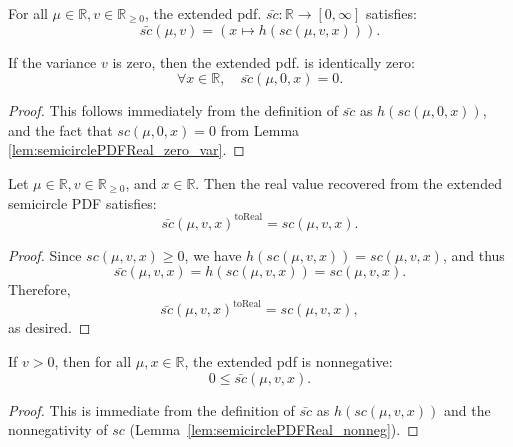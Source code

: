 \begin{lemma}
  \leanok
  \label{lem:semicirclePDF_def}
  For all $\mu \in \mathbb{R} , v \in \mathbb{R}_{\geq 0}$, the extended pdf. $ \bar{sc} : \mathbb{R} \to [0,\infty]$  satisfies:
  $$
    \bar{sc}(\mu,v) = \left( x \mapsto h(sc(\mu,v,x)) \right).
  $$
\end{lemma}

\begin{lemma}
  \leanok
  \label{lem:semicirclePDF_zero_var}
  If the variance $v$ is zero, then the extended pdf. is identically zero:
 $$ 
    \forall x \in \mathbb{R}, \quad \bar{sc}(\mu,0,x) = 0.
 $$ 
\end{lemma}
\begin{proof}
    This follows immediately from the definition of $\bar{sc}$ as $h(sc(\mu,0,x))$, and the fact that $sc(\mu,0,x) = 0$ from Lemma \ref{lem:semicirclePDFReal_zero_var}.
\end{proof}

\begin{lemma}
    \leanok
    \label{lem:toReal_semicirclePDF}
    Let $ \mu \in \mathbb{R} ,  v \in \mathbb{R}_{\ge 0}$, and $x \in \mathbb{R} $.
Then the real value recovered from the extended semicircle PDF satisfies:
\[
    \bar{sc}(\mu, v, x)^{\operatorname{toReal}} = sc(\mu, v, x).
\]
\end{lemma}
\begin{proof}
Since $sc(\mu, v, x) \ge 0$, we have $h(sc(\mu, v, x)) = sc(\mu, v, x)$, and thus
\[
    \bar{sc}(\mu, v, x) = h(sc(\mu, v, x)) = sc(\mu, v, x).
\]
Therefore,
\[
    \bar{sc}(\mu, v, x)^{\operatorname{toReal}} = sc(\mu, v, x),
\]
as desired.
\end{proof}

\begin{lemma}
  \leanok
  \label{lem:semicirclePDF_nonneg}
  If $v > 0$, then for all $\mu, x \in \mathbb{R}$, the extended pdf is nonnegative:
  \[
      0 \le \bar{sc}(\mu,v,x).
  \]
\end{lemma}
\begin{proof}
    This is immediate from the definition of $\bar{sc}$ as $h(sc(\mu,v,x))$ and the nonnegativity of $sc$ (Lemma~\ref{lem:semicirclePDFReal_nonneg}).
\end{proof}

